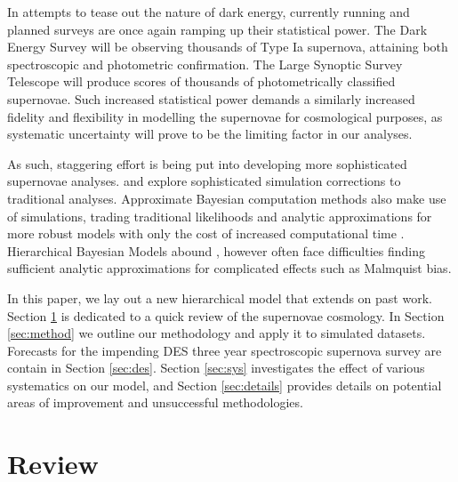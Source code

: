 \documentclass[a4paper,fleqn,usenatbib]{mnras}
\begin{document}
In attempts to tease out the nature of dark energy, currently running and planned surveys are once again ramping up their statistical power. The Dark Energy Survey \citep[DES,][]{Bernstein2012, Abbott2016} will be observing thousands of Type Ia supernova, attaining both spectroscopic and photometric confirmation. The Large Synoptic Survey Telescope \citep[LSST,][]{Ivezic2008, LSSTScienceCollaboration2009} will produce scores of thousands of photometrically classified supernovae. Such increased statistical power demands a similarly increased fidelity and flexibility in modelling the supernovae for cosmological purposes, as systematic uncertainty will prove to be the limiting factor in our analyses.

As such, staggering effort is being put into developing more sophisticated supernovae analyses. \citet{Scolnic2016} and \citet{Kessler2017} explore sophisticated simulation corrections to traditional analyses. Approximate Bayesian computation methods also make use of simulations, trading traditional likelihoods and analytic approximations for more robust models with only the cost of increased computational time \citep{Weyant2013, Jennings2016}. Hierarchical Bayesian Models abound \citep{Mandel2009, March2011, March2014, Rubin2015, Shariff2016, Roberts2017}, however often face difficulties finding sufficient analytic approximations for complicated effects such as Malmquist bias.


In this paper, we lay out a new hierarchical model that extends on past work. Section \ref{sec:review} is dedicated to a quick review of the supernovae cosmology. In Section \ref{sec:method} we outline our methodology and apply it to simulated datasets. Forecasts for the impending DES three year spectroscopic supernova survey are contain in Section \ref{sec:des}. Section \ref{sec:sys} investigates the effect of various systematics on our model, and Section \ref{sec:details} provides details on potential areas of improvement and unsuccessful methodologies.









\section{Review}
\label{sec:review}
\end{document}
